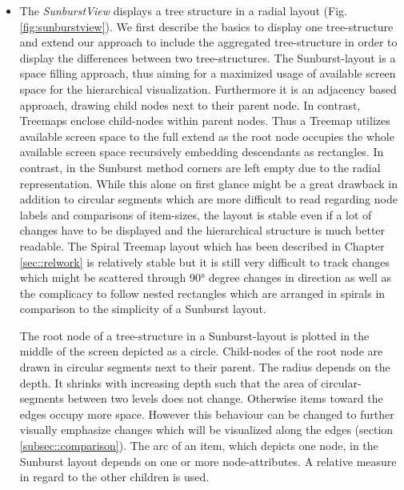 \begin{itemize}
The diff-algorithm is only ever called once for every visible view\footnote{the only exception are small multiple displays which represents changes among several tree-structures}. The diff-tuples are then broadcasted to all other views which are capable of displaying the aggregated tree-structure.

\item
The \emph{SunburstView} displays a tree structure in a radial layout (Fig. \ref{fig:sunburstview}). We first describe the basics to display one tree-structure and extend our approach to include the aggregated tree-structure in order to display the differences between two tree-structures. The Sunburst-layout is a space filling approach, thus aiming for a maximized usage of available screen space for the hierarchical visualization. Furthermore it is an adjacency based approach, drawing child nodes next to their parent node. In contrast, Treemaps enclose child-nodes within parent nodes. Thus a Treemap utilizes available screen space to the full extend as the root node occupies the whole available screen space recursively embedding descendants as rectangles. In contrast, in the Sunburst method corners are left empty due to the radial representation. While this alone on first glance might be a great drawback in addition to circular segments which are more difficult to read regarding node labels and comparisons of item-sizes, the layout is stable even if a lot of changes have to be displayed and the hierarchical structure is much better readable. The Spiral Treemap layout which has been described in Chapter \ref{sec::relwork} is relatively stable but it is still very difficult to track changes which might be scattered through 90° degree changes in direction as well as the complicacy to follow nested rectangles which are arranged in spirals in comparison to the simplicity of a Sunburst layout.

The root node of a tree-structure in a Sunburst-layout is plotted in the middle of the screen depicted as a circle. Child-nodes of the root node are drawn in circular segments next to their parent. The radius depends on the depth. It shrinks with increasing depth such that the area of circular-segments between two levels does not change. Otherwise items toward the edges occupy more space. However this behaviour can be changed to further visually emphasize changes which will be visualized along the edges (section \ref{subsec::comparison}). The arc of an item, which depicts one node, in the Sunburst layout depends on one or more node-attributes. A relative measure in regard to the other children is used.


\end{itemize}
